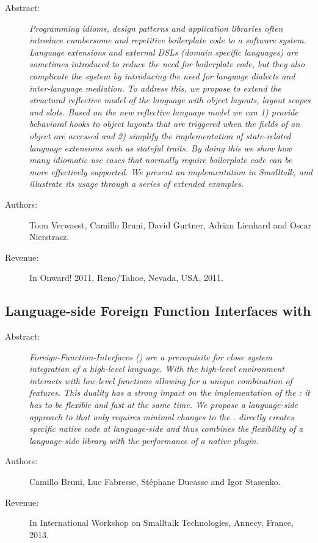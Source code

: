 \begin{description}
	\item[Abstract:] \emph{
Programming idioms, design patterns and application libraries often introduce cumbersome and repetitive boilerplate code to a software system.
Language extensions and external {DSLs} (domain specific languages) are sometimes introduced to reduce the need for boilerplate code, but they also complicate the system by introducing the need for language dialects and inter-language mediation.
To address this, we propose to extend the structural reflective model of the language with object layouts, layout scopes and slots.
Based on the new reflective language model we can 1) provide behavioral hooks to object layouts that are triggered when the fields of an object are accessed and 2) simplify the implementation of state-related language extensions such as stateful traits.
By doing this we show how many idiomatic use cases that normally require boilerplate code can be more effectively supported.
We present an implementation in Smalltalk, and illustrate its usage through a series of extended examples.}

	\item[Authors:] Toon Verwaest, Camillo Bruni, David Gurtner, Adrian Lienhard and Oscar Nierstrasz. 
	\item[Revenue:] In Onward! 2011, Reno/Tahoe, Nevada, USA, 2011.
\end{description}

\subsection{Language-side Foreign Function Interfaces with \NB}
\begin{description}
	\item[Abstract:] \emph{
Foreign-Function-Interfaces (\FFIs) are a prerequisite for close system integration of a high-level language.
With \FFIs the high-level environment interacts with low-level functions allowing for a unique combination of features.
This duality has a strong impact on the implementation of the \FFI: it has to be flexible and fast at the same time.
We propose \NB a language-side approach to \FFIs that only requires minimal changes to the \VM.
\NB directly creates specific native code at language-side and thus combines the flexibility of a language-side library with the performance of a native plugin.}

	\item[Authors:] Camillo Bruni, Luc Fabresse, Stéphane Ducasse and Igor Stasenko. 
	\item[Revenue:] In International Workshop on Smalltalk Technologies, Annecy, France, 2013.
\end{description}



